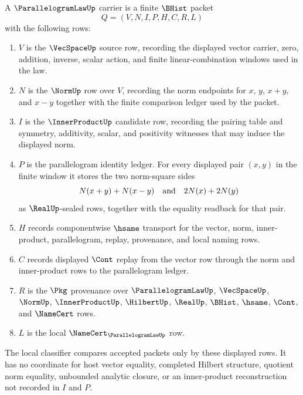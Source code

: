 \begin{definition}
\label{def:parallelogram-law-carrier}
A $\ParallelogramLawUp$ carrier is a finite $\BHist$ packet
$$
Q=(V,N,I,P,H,C,R,L)
$$
with the following rows:
\begin{enumerate}
\item $V$ is the $\VecSpaceUp$ source row, recording the displayed vector carrier, zero, addition, inverse, scalar action, and finite linear-combination windows used in the law.
\item $N$ is the $\NormUp$ row over $V$, recording the norm endpoints for $x$, $y$, $x+y$, and $x-y$ together with the finite comparison ledger used by the packet.
\item $I$ is the $\InnerProductUp$ candidate row, recording the pairing table and symmetry, additivity, scalar, and positivity witnesses that may induce the displayed norm.
\item $P$ is the parallelogram identity ledger. For every displayed pair $(x,y)$ in the finite window it stores the two norm-square sides
$$
N(x+y)+N(x-y)
\quad\hbox{and}\quad
2N(x)+2N(y)
$$
as $\RealUp$-sealed rows, together with the equality readback for that pair.
\item $H$ records componentwise $\hsame$ transport for the vector, norm, inner-product, parallelogram, replay, provenance, and local naming rows.
\item $C$ records displayed $\Cont$ replay from the vector row through the norm and inner-product rows to the parallelogram ledger.
\item $R$ is the $\Pkg$ provenance over $\ParallelogramLawUp$, $\VecSpaceUp$, $\NormUp$, $\InnerProductUp$, $\HilbertUp$, $\RealUp$, $\BHist$, $\hsame$, $\Cont$, and $\NameCert$ rows.
\item $L$ is the local $\NameCert_{\ParallelogramLawUp}$ row.
\end{enumerate}
The local classifier compares accepted packets only by these displayed rows. It has no coordinate for host vector equality, completed Hilbert structure, quotient norm equality, unbounded analytic closure, or an inner-product reconstruction not recorded in $I$ and $P$.
\end{definition}

